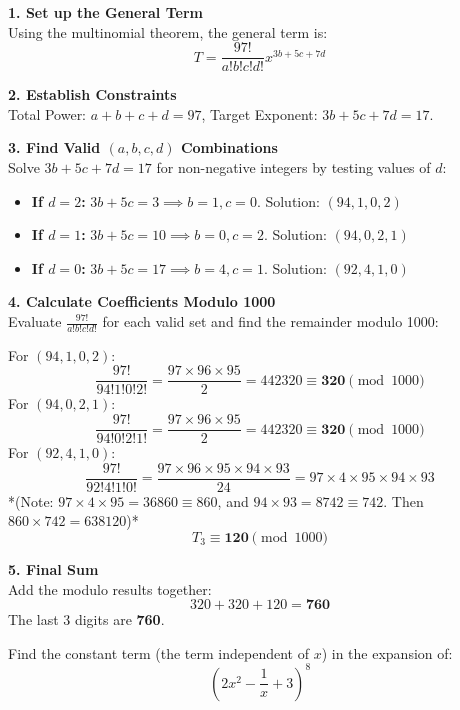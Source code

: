 \documentclass[12pt]{article}
\begin{document}
\begin{solutionbox*}[Solution]
\textbf{1. Set up the General Term}\\
Using the multinomial theorem, the general term is:
\[
T = \frac{97!}{a! b! c! d!} x^{3b + 5c + 7d}
\]

\textbf{2. Establish Constraints}\\
Total Power: $a + b + c + d = 97$, Target Exponent: $3b + 5c + 7d = 17$.

\textbf{3. Find Valid $(a, b, c, d)$ Combinations}\\
Solve $3b + 5c + 7d = 17$ for non-negative integers by testing values of $d$:
\begin{itemize}[leftmargin=*]
\item \textbf{If $d = 2$:} $3b + 5c = 3 \implies b = 1, c = 0$. Solution: \textbf{$(94, 1, 0, 2)$}
\item \textbf{If $d = 1$:} $3b + 5c = 10 \implies b = 0, c = 2$. Solution: \textbf{$(94, 0, 2, 1)$}
\item \textbf{If $d = 0$:} $3b + 5c = 17 \implies b = 4, c = 1$. Solution: \textbf{$(92, 4, 1, 0)$}
\end{itemize}

\textbf{4. Calculate Coefficients Modulo 1000}\\
Evaluate $\frac{97!}{a! b! c! d!}$ for each valid set and find the remainder modulo 1000:

For $(94, 1, 0, 2)$:
\[
\frac{97!}{94! 1! 0! 2!} = \frac{97 \times 96 \times 95}{2} = 442320 \equiv \mathbf{320} \pmod{1000}
\]
For $(94, 0, 2, 1)$:
\[
\frac{97!}{94! 0! 2! 1!} = \frac{97 \times 96 \times 95}{2} = 442320 \equiv \mathbf{320} \pmod{1000}
\]
For $(92, 4, 1, 0)$:
\[
\frac{97!}{92! 4! 1! 0!} = \frac{97 \times 96 \times 95 \times 94 \times 93}{24} = 97 \times 4 \times 95 \times 94 \times 93
\]
*(Note: $97 \times 4 \times 95 = 36860 \equiv 860$, and $94 \times 93 = 8742 \equiv 742$. Then $860 \times 742 = 638120$)*
\[
T_3 \equiv \mathbf{120} \pmod{1000}
\]

\textbf{5. Final Sum}\\
Add the modulo results together:
\[
320 + 320 + 120 = \mathbf{760}
\]
The last 3 digits are \textbf{760}.
\end{solutionbox*}

\begin{problembox*}
Find the constant term (the term independent of $x$) in the expansion of:
\[
\left(2x^2 - \frac{1}{x} + 3\right)^8
\]
\end{problembox*}
\end{document}
